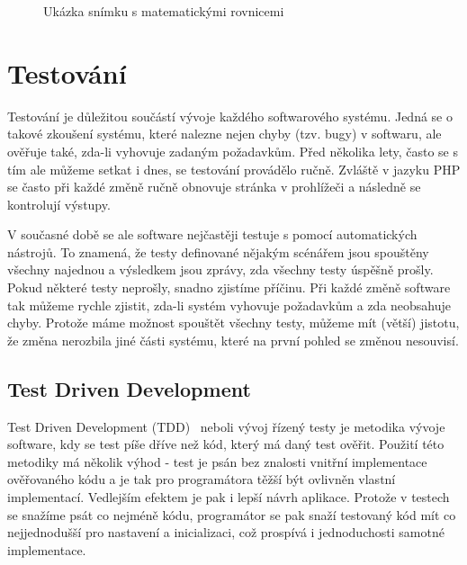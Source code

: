 \documentclass[11pt,twoside,a4paper]{book}
\newcommand*{\nomExpl}[2]{#2 (#1)\nomenclature{#1}{#2}} 	%
\begin{document}
\begin{figure}[ht]
	\begin{center}
		\caption{Ukázka snímku s matematickými rovnicemi}
		\label{fig:rovnice}
	\end{center}
\end{figure}



\chapter{Testování}
Testování je důležitou součástí vývoje každého softwarového systému. Jedná se o takové zkoušení systému, které nalezne nejen chyby (tzv. bugy) v softwaru, ale ověřuje také, zda-li vyhovuje zadaným požadavkům. Před několika lety, často se s tím ale můžeme setkat i dnes, se testování provádělo ručně. Zvláště v jazyku PHP se často při každé změně ručně obnovuje stránka v prohlížeči a následně se kontrolují výstupy.

V současné době se ale software nejčastěji testuje s pomocí automatických nástrojů. To znamená, že testy definované nějakým scénářem jsou spouštěny všechny najednou a výsledkem jsou zprávy, zda všechny testy úspěšně prošly. Pokud některé testy neprošly, snadno zjistíme příčinu. Při každé změně software tak můžeme rychle zjistit, zda-li systém vyhovuje požadavkům a zda neobsahuje chyby. Protože máme možnost spouštět všechny testy, můžeme mít (větší) jistotu, že změna nerozbila jiné části systému, které na první pohled se změnou nesouvisí.


\section{Test Driven Development}
\nomExpl{TDD}{Test Driven Development}~\cite{tdd} neboli vývoj řízený testy je metodika vývoje software, kdy se test píše dříve než kód, který má daný test ověřit. Použití této metodiky má několik výhod - test je psán bez znalosti vnitřní implementace ověřovaného kódu a je tak pro programátora těžší být ovlivněn vlastní implementací. Vedlejším efektem je pak i lepší návrh aplikace. Protože v testech se snažíme psát co nejméně kódu, programátor se pak snaží testovaný kód mít co nejjednodušší pro nastavení a inicializaci, což prospívá i jednoduchosti samotné implementace.
\end{document}
